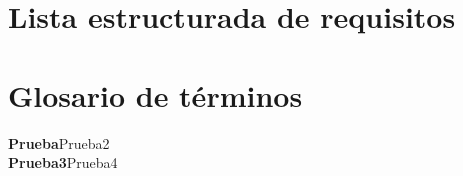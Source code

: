 \documentclass[11pt,a4paper]{article}
\newcommand{\term}[2]{\textbf{#1}\quad#2\\}
\begin{document}
\section{Lista estructurada de requisitos} %
\label{sec:lista_estructurada_de_requisitos}


\section{Glosario de términos} %
\label{sec:glosario_de_términos}

\term{Prueba}{Prueba2}
\term{Prueba3}{Prueba4}



	
\end{document}
